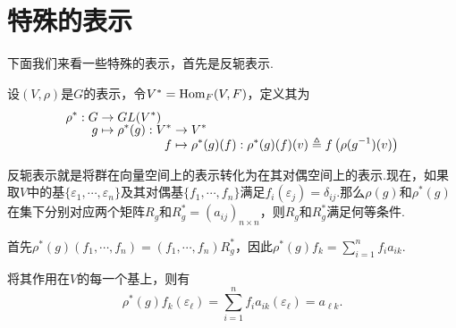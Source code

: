 \section{特殊的表示}
下面我们来看一些特殊的表示，首先是反轭表示.
\begin{definition}
    设$(V,\rho)$是$G$的表示，令$V^*=\operatorname{Hom}_F(V,F)$，定义其为 \[\setjot[-2]\begin{aligned}[t]
        \rho^*:G&\to GL(V^*) \\
        g&\mapsto \rho^*(g): \setjot[-2]\begin{aligned}[t]
            V^* &\to V^* \\
            f &\mapsto \rho^*(g)(f):\rho^*(g)(f)(v)\triangleq f\left(\rho(g^{-1})(v)\right)
        \end{aligned}
    \end{aligned}\]
\end{definition}
反轭表示就是将群在向量空间上的表示转化为在其对偶空间上的表示.现在，如果取$V$中的基$\{\varepsilon_1,\cdots,\varepsilon_n\}$及其对偶基$\{f_1,\cdots,f_n\}$满足$f_i(\varepsilon_j)=\delta_{ij}$.那么$\rho(g)$和$\rho^*(g)$在集下分别对应两个矩阵$R_g$和$R^*_g=(a_{ij})_{n\times n}$，则$R_g$和$R^*_g$满足何等条件.\par
首先$\rho^*(g)(f_1,\cdots,f_n)=(f_1,\cdots,f_n)R^*_g$，因此$\rho^*(g)f_k=\sum_{i=1}^n f_ia_{ik}$.\par
将其作用在$V$的每一个基上，则有\begin{equation*}
    \rho^*(g)f_k(\varepsilon_\ell)=\sum_{i=1}^nf_ia_{ik}(\varepsilon_\ell)=a_{\ell k}.
\end{equation*}

